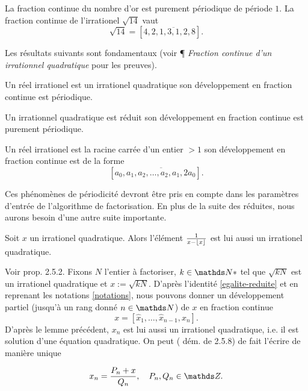 \begin{exemple}
	La fraction continue du nombre d'or est purement périodique de période $1$.
	La fraction continue de l'irrationel $\sqrt{14}$ vaut \[\sqrt{14} = [4,
	\overline{2, 1, 3, 1, 2, 8}].\]
\end{exemple}

Les résultats suivants sont fondamentaux (voir \cite{wikiu} ¶ \emph{Fraction
continue d'un irrationnel quadratique} pour les preuves).

\begin{theoreme}[Lagrange, 1770]
	Un réel irrationel est un irrationel quadratique \ssi son développement en
	fraction continue est périodique.
\end{theoreme}

\begin{theoreme}[Galois, 1829]
	Un irrationnel quadratique est réduit \ssi son développement en fraction
	continue est purement périodique.
\end{theoreme}

\begin{theoreme}[Legendre, 1798]
	Un réel irrationel est la racine carrée d'un entier $>1$ \ssi son
	développement en fraction continue est de la forme \[[a_0, \overline{a_1,
	a_2, \dots, a_2, a_1, 2a_0}].\]
\end{theoreme}

Ces phénomènes de périodicité devront être pris en compte dans les paramètres
d'entrée de l'algorithme de factorisation. En plus de la suite des réduites,
nous aurons besoin d'une autre suite importante.

\begin{lemme}
	Soit $x$ un irrationel quadratique. Alors l'élément $\frac{1}{x - \lfloor x\rfloor}$
	est lui aussi un irrationel quadratique.
\end{lemme}

Voir \cite{Lauritzen} prop. 2.5.2. Fixons $N$ l'entier à factoriser, $k\in \N*$
tel que $\sqrt{kN}$ est un irrationel quadratique et $x :=
\sqrt{kN}$. D'après l'identité \ref{egalite-reduite} et en
reprenant les notations \ref{notations}, nous pouvons donner un développement
partiel (jusqu'à un rang donné $n\in \N$) de $x$ en fraction continue \[x =
[\hat{x}_1, \dots, \hat{x}_{n-1}, x_n].\] D'après le lemme précédent, $x_n$ est
lui aussi un irrationel quadratique, i.e.  il est solution d'une équation
quadratique. On peut (\cite{Lauritzen} dém. de 2.5.8) de fait l'écrire de
manière unique 

\begin{equation}
	x_n = \frac{P_n + x}{Q_n}, \quad P_n, Q_n \in \Z.
\end{equation}

